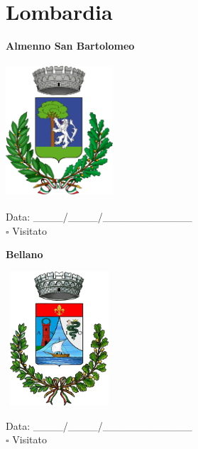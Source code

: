 \documentclass[a5paper,12pt]{article}
\begin{document}
\newpage

\section*{Lombardia}

\newpage

\noindent
\begin{minipage}[t]{0.45\textwidth}
    \begin{center}
        \textbf{Almenno San Bartolomeo}
    \end{center}
    \vspace{-0.5cm} %
    \begin{center}
        \includegraphics[height= 5cm, width=4cm]{Lombardia/Stemma Almenno San Bartolomeo.png}
    \end{center}
    \vspace{-0.4cm} %
    \begin{flushleft}
        Data: \_\_\_\_/\_\_\_\_/\_\_\_\_\_\_\_\_\_\_\_\_ \\
        $\square$ Visitato
    \end{flushleft}
\end{minipage}
\hfill
\noindent
\begin{minipage}[t]{0.45\textwidth}
    \begin{center}
        \textbf{Bellano}
    \end{center}
    \vspace{-0.5cm} %
    \begin{center}
        \includegraphics[height= 5cm, width=4cm]{Lombardia/Stemma Bellano.png}
    \end{center}
    \vspace{-0.4cm} %
    \begin{flushleft}
        Data: \_\_\_\_/\_\_\_\_/\_\_\_\_\_\_\_\_\_\_\_\_ \\
        $\square$ Visitato
    \end{flushleft}
\end{minipage}
\end{document}

